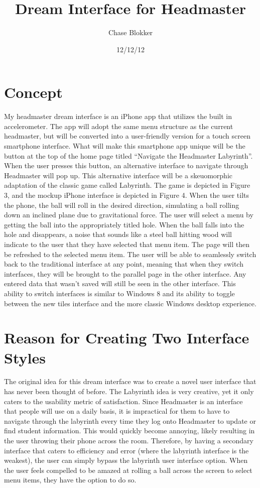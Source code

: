 \documentclass{article}
\title{Dream Interface for Headmaster}
\author{Chase Blokker}
\date{12/12/12}
\begin{document}
\maketitle


\section{Concept}
\label{Concept}

My headmaster dream interface is an iPhone app that utilizes the built in accelerometer.  The app will adopt the same menu structure as the current headmaster, but will be converted into a user-friendly version for a touch screen smartphone interface.   What will make this smartphone app unique will be the button at the top of the home page titled “Navigate the Headmaster Labyrinth”.  When the user presses this button, an alternative interface to navigate through Headmaster will pop up.   This alternative interface will be a skeuomorphic adaptation of the classic game called Labyrinth.  The game is depicted in Figure 3, and the mockup iPhone interface is depicted in Figure 4.  When the user tilts the phone, the ball will roll in the desired direction, simulating a ball rolling down an inclined plane due to gravitational force.  The user will select a menu by getting the ball into the appropriately titled hole.  When the ball falls into the hole and disappears, a noise that sounds like a steel ball hitting wood will indicate to the user that they have selected that menu item. The page will then be refreshed to the selected menu item.  The user will be able to seamlessly switch back to the traditional interface at any point, meaning that when they switch interfaces, they will be brought to the parallel page in the other interface.  Any entered data that wasn’t saved will still be seen in the other interface.  This ability to switch interfaces is similar to Windows 8 and its ability to toggle between the new tiles interface and the more classic Windows desktop experience.


\section{Reason for Creating Two Interface Styles}
\label{Reason for Creating Two Interface Styles}

The original idea for this dream interface was to create a novel user interface that has never been thought of before.  The Labyrinth idea is very creative, yet it only caters to the usability metric of satisfaction.  Since Headmaster is an interface that people will use on a daily basis, it is impractical for them to have to navigate through the labyrinth every time they log onto Headmaster to update or find student information.  This would quickly become annoying, likely resulting in the user throwing their phone across the room.  Therefore, by having a secondary interface that caters to efficiency and error (where the labyrinth interface is the weakest), the user can simply bypass the labyrinth user interface option.  When the user feels compelled to be amazed at rolling a ball across the screen to select menu items, they have the option to do so.
\end{document}
